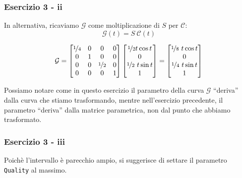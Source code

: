\documentclass{beamer}
\newcommand{\fig}{figures} %
\begin{document}
\begin{frame}
\frametitle{Esercizio 3 - ii}
In alternativa, ricaviamo $\mathcal G$ come moltiplicazione di $S$ per $\mathcal C$:
\begin{displaymath}
    \mathcal G(t) = S \ \mathcal C(t)
\end{displaymath}

\begin{displaymath}
    \mathcal G = 
\begin{bmatrix}
    \nicefrac{1}{4} &       0 & 0 & 0\\
    0  & 1 & 0 & 0 \\ 
    0 & 0 & \nicefrac{1}{2} & 0 \\
    0 & 0 & 0 & 1
\end{bmatrix}
\begin{bmatrix}
    \nicefrac{1}{2} t \cos t \\
    0 \\
    \nicefrac{1}{2} \ t \sin t \\
    1
\end{bmatrix}
 =
\begin{bmatrix}
    \nicefrac{1}{8} \ t \cos t \\
    0 \\
    \nicefrac{1}{4} \ t \sin t \\
    1
\end{bmatrix}
\end{displaymath}

    \vspace{0.7cm}
Possiamo notare come in questo esercizio il parametro della curva $\mathcal G$ ``deriva'' dalla curva che stiamo trasformando,
    mentre nell'esercizio precedente, il parametro ``deriva'' dalla matrice parametrica, non dal punto che abbiamo trasformato.
\end{frame}

%
\begin{frame}
\frametitle{Esercizio 3 - iii}
\begin{center}
\end{center}
    Poich\`e l'intervallo \`e parecchio ampio, si suggerisce di settare il parametro \texttt{Quality} al massimo.
\end{frame}
\end{document}
